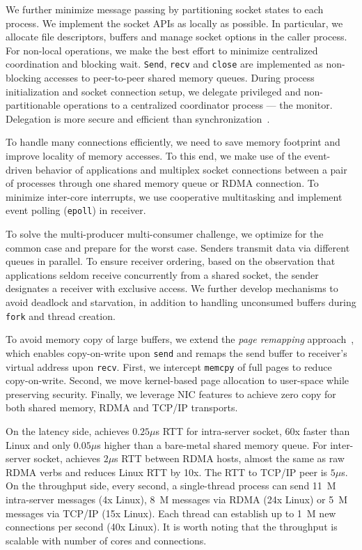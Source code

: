 We further minimize message passing by partitioning socket states to each process. We implement the socket APIs as locally as possible. In particular, we allocate file descriptors, buffers and manage socket options in the caller process. For non-local operations, we make the best effort to minimize centralized coordination and blocking wait. \texttt{Send}, \texttt{recv} and \texttt{close} are implemented as non-blocking accesses to peer-to-peer shared memory queues. During process initialization and socket connection setup, we delegate privileged and non-partitionable operations to a centralized coordinator process --- the monitor. Delegation is more secure and efficient than synchronization~\cite{roghanchi2017ffwd}.

To handle many connections efficiently, we need to save memory footprint and improve locality of memory accesses. To this end, we make use of the event-driven behavior of applications and multiplex socket connections between a pair of processes through one shared memory queue or RDMA connection. To minimize inter-core interrupts, we use cooperative multitasking and implement event polling (\texttt{epoll}) in receiver. %

To solve the multi-producer multi-consumer challenge, we optimize for the common case and prepare for the worst case. Senders transmit data via different queues in parallel. To ensure receiver ordering, based on the observation that applications seldom receive concurrently from a shared socket, the sender designates a receiver with exclusive access. We further develop mechanisms to avoid deadlock and starvation, in addition to handling unconsumed buffers during \texttt{fork} and thread creation.

To avoid memory copy of large buffers, we extend the \textit{page remapping} approach~\cite{thadani1995efficient,chu1996zero}, which enables copy-on-write upon \texttt{send} and remaps the send buffer to receiver's virtual address upon \texttt{recv}. First, we intercept \texttt{memcpy} of full pages to reduce copy-on-write. Second, we move kernel-based page allocation to user-space while preserving security. Finally, we leverage NIC features to achieve zero copy for both shared memory, RDMA and TCP/IP transports.

On the latency side, \sys{} achieves $0.25\mu$s RTT for intra-server socket, 60x faster than Linux and only $0.05\mu$s higher than a bare-metal shared memory queue. For inter-server socket, \sys{} achieves $2\mu$s RTT between RDMA hosts, almost the same as raw RDMA verbs and reduces Linux RTT by 10x. The RTT to TCP/IP peer is $5\mu$s. On the throughput side, every second, a single-thread process can send 11~M intra-server messages (4x Linux), 8~M messages via RDMA (24x Linux) or 5~M messages via TCP/IP (15x Linux). Each thread can establish up to 1~M new connections per second (40x Linux). It is worth noting that the throughput is scalable with number of cores and connections.

